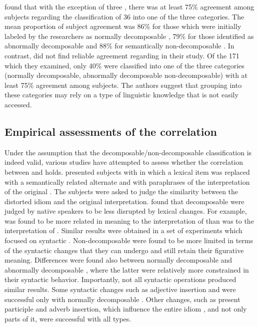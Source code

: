 \documentclass[output=paper]{langsci/langscibook}
\begin{document}
\citet{gibbs89} found that with the exception of three , there was at least 75\% agreement among subjects regarding the classification of 36  into one of the three categories.
The mean proportion of subject agreement was 86\% for those  which were initially labeled by the researchers as normally decomposable , 79\% for those identified as abnormally decomposable  and 88\% for semantically non-de\-com\-pos\-able .
In contrast, \citet{titoneconnine94} did not find reliable agreement regarding
 in their study. Of the 171  which they examined, only 40\% were classified into one of the three categories (normally decomposable, abnormally decomposable non-decomposable) with at least 75\% agreement among subjects. The authors suggest that grouping  into these categories may rely on a type of linguistic knowledge that is not easily accessed.


\subsection{Empirical assessments of the correlation}

Under the assumption that the decomposable/non-decomposable
classification is indeed valid, various studies have attempted to
assess whether the correlation between  and 
holds.
\citet{gibbs89} presented subjects with  in which a lexical item was replaced with a semantically related alternate and with paraphrases of the interpretation of the original . The subjects were asked to judge the similarity between the distorted idiom and the original interpretation. \citeauthor{gibbs89} found that decomposable  were judged by native speakers to be less disrupted by lexical changes. For example,  was found to be more related in meaning to the interpretation of  than  was to the interpretation of . Similar results were obtained in a set of experiments which focused on syntactic  \citep{gibbsnayak89psycho}. Non-decomposable  were found to be more limited in terms of the syntactic changes that they can undergo and still retain their figurative meaning. Differences were found also between normally decomposable and abnormally decomposable , where the latter were relatively more constrained in their syntactic behavior. Importantly, not all syntactic operations produced similar results. Some syntactic changes such as adjective insertion and  were successful only with normally decomposable . Other changes, such as present participle and adverb insertion, which influence the entire idiom , and not only parts of it, were successful with all types.
\end{document}
